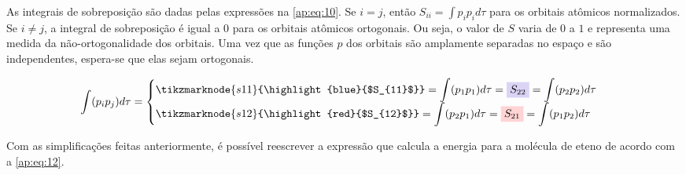 As integrais de sobreposição são dadas pelas expressões na \autoref{ap:eq:10}. Se $i=j$, então $S_{ii} = \displaystyle \int p_i p_i d \tau$ para os orbitais atômicos normalizados. Se $i \neq j $, a integral de sobreposição é igual a $0$ para os orbitais atômicos ortogonais. Ou seja, o valor de $S$ varia de $0$ a $1$ e representa uma medida da não-ortogonalidade dos orbitais. Uma vez que as funções $p$ dos orbitais são amplamente separadas no espaço e são independentes, espera-se que elas sejam ortogonais.

\begin{figure}[htb]
    \vspace{2\baselineskip}
\begin{equation}
\label{ap:eq:10}
\displaystyle \int (p_i p_j) d\tau =
\begin{cases}
 \tikzmarknode{s11}{\highlight{blue}{$S_{11}$}} = \displaystyle \int (p_1 p_1) d\tau = \highlight{blue}{$S_{22}$} = \displaystyle \int (p_2 p_2) d\tau \\
 \tikzmarknode{s12}{\highlight{red}{$S_{12}$}} = \displaystyle \int (p_2 p_1) d\tau = \highlight{red}{$S_{21}$} = \displaystyle \int (p_1 p_2) d\tau
\end{cases}
\end{equation}
\end{figure}

Com as simplificações feitas anteriormente, é possível reescrever a expressão que calcula a energia para a molécula de eteno de acordo com a \autoref{ap:eq:12}.

